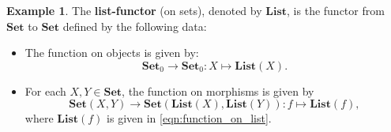 \documentclass[a4paper,10pt]{scrartcl}
\theoremstyle{plain}
\theoremstyle{definition}
\newtheorem{exa}[thm]{Example}
\newcommand{\cfont}[1]{\ensuremath{\mathsf{#1}}}
\newcommand{\Catb}[1]{\mathbf{#1}}
\newcommand{\List}{\Catb{List}}
\newcommand{\SET}{\Catb{Set}}
\newcommand{\Ob}[1]{{#1}_0}
\newcommand{\CHom}[3]{{#1}(#2,#3)}
\newcommand{\Id}[1][]{\cfont{Id}_{#1}}
\newcommand{\Comp}{\cdot}
\begin{document}
\begin{exa} \label{example:functor_list} The \textbf{list-functor} (on sets), denoted by $\List$, is the functor from $\SET$ to $\SET$ defined by the following data:
\begin{itemize}
\item The function on objects is given by:
\[
\Ob{\SET}\to \Ob{\SET}: X\mapsto \List(X).
\]
\item For each $X,Y\in\SET$, the function on morphisms is given by
\[
\CHom{\SET}{X}{Y} \to \CHom{\SET}{\List(X)}{\List(Y)}: f\mapsto \List(f),
\]
where $\mathbf{List}(f)$ is given in \cref{eqn:function_on_list}.
\end{itemize}


\begin{comment}
\begin{proof}
The data is clearly well-defined since we work with \textit{mere} sets, i.e. no extra structure. That $\List$ would preserve the identity means that $\List(\Id[X]) = \Id[\List(X)]$, i.e. we have to show that for each $X$-valued list $\ell$, we have:
\[
\List(\Id[X])(\ell)) = \Id[\List(X)](A)(\ell).
\] 
The lefthand-side of the equation is given by:
$$\mathbf{List}(\Id[X])(\{x_i\}_i) = \{\Id[X] (x_i)\}_i = \{x_i\}_i,$$
where the first (resp. second) equality holds by definition of $\mathbf{List}$ on morphisms (resp. by definition of $\Id[X]$).\\
The righthand-side of the equation is given by:
$$\Id[\mathbf{List}(X)](A)(\{x_i\}_i) = \{x_i\}_i,$$
by definition of the identity morphism in $\SET$. Hence, the left and right hand side are equal which shows that $\mathbf{List}$ indeed preserves the identity.\\
We now show that $\mathbf{List}$ preserves composition. Let $f\in \CHom{\SET}{X}{Y}$ and $g\in \CHom{\SET}{Y}{Z}$ be functions. By definition of the composition in $\SET$ and by definition of $\mathbf{List}$ on morphisms, we have for each $X$-valued list $\{x_i\}_i$:
\begin{eqnarray}\label{eqn:functor_list_comp1}
\mathbf{List}(f\Comp g)(\{x_i\}_i) = \{(f\Comp g)(x_i)\}_i = \{g(f(x_i)\}_i.
\end{eqnarray}
Again by definition of the composition in $\SET$ and by definition of $\mathbf{List}$ on morphisms, we have for each $X$-valued list $\{x_i\}_i$:
\begin{eqnarray}\label{eqn:functor_list_comp2}
\left(\mathbf{List}(f)\Comp \mathbf{List}(g)\right)(\{x_i\}_i) = \mathbf{List}(g)\left(\{f(x_i)\}_i\right) = \{g(f(x_i)\}_i.
\end{eqnarray}
Hence, by combining \cref{eqn:functor_list_comp1, eqn:functor_list_comp2}, we conclude that for each $X$-valued list $\{x_i\}_i$ we have
\[
\mathbf{List}(f\Comp g)(\{x_i\}_i) = \left(\mathbf{List}(f)\Comp \mathbf{List}(g)\right)(\{x_i\}_i).
\]
Since this holds for every such list, we indeed have that the composition is preserved.
\end{proof}
\end{comment}
\end{exa}
\end{document}
